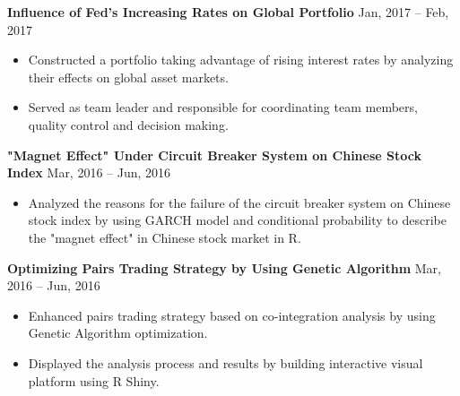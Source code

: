 \documentclass[a4paper,12pt]{report}
\newcommand{\marginAdj}{0.5in}
\begin{document}
\noindent 
\textbf{Influence of Fed's Increasing Rates on Global Portfolio}  \hspace*{\marginAdj}  \hspace*{1.55in} {\fontsize{10pt}{10pt}\selectfont Jan, 2017 – Feb, 2017} \par
\noindent 
\begin{itemize}[noitemsep,topsep=0pt]
\item {\fontsize{10pt}{10pt}\selectfont Constructed a portfolio taking advantage of rising interest rates by analyzing their effects on global asset markets.} \par
\noindent 
\item {\fontsize{10pt}{10pt}\selectfont Served as team leader and responsible for coordinating team members, quality control and decision making.} \par
\end{itemize}
\noindent 
\textbf{"Magnet Effect" Under Circuit Breaker System on Chinese Stock Index} \hspace*{0.35in}\hspace*{\marginAdj} {\fontsize{10pt}{10pt}\selectfont Mar, 2016 – Jun, 2016} \par
\noindent 
\begin{itemize}[noitemsep,topsep=0pt]
\item {\fontsize{10pt}{10pt}\selectfont Analyzed the reasons for the failure of the circuit breaker system on Chinese stock index by using GARCH model and conditional probability to describe the "magnet effect" in Chinese stock market in R.} \par
\end{itemize}
\noindent 
\textbf{Optimizing Pairs Trading Strategy by Using Genetic Algorithm} \hspace*{0.95in}  \hspace*{\marginAdj} {\fontsize{10pt}{10pt}\selectfont  Mar, 2016 – Jun, 2016} \par
\noindent 
\begin{itemize}[noitemsep,topsep=0pt]
\item {\fontsize{10pt}{10pt}\selectfont Enhanced pairs trading strategy based on co-integration analysis by using Genetic Algorithm optimization.}
\item {\fontsize{10pt}{10pt}\selectfont Displayed the analysis process and results by building interactive visual platform using R Shiny.}
\end{itemize}
 \par
\vspace{9pt}
\end{document}
